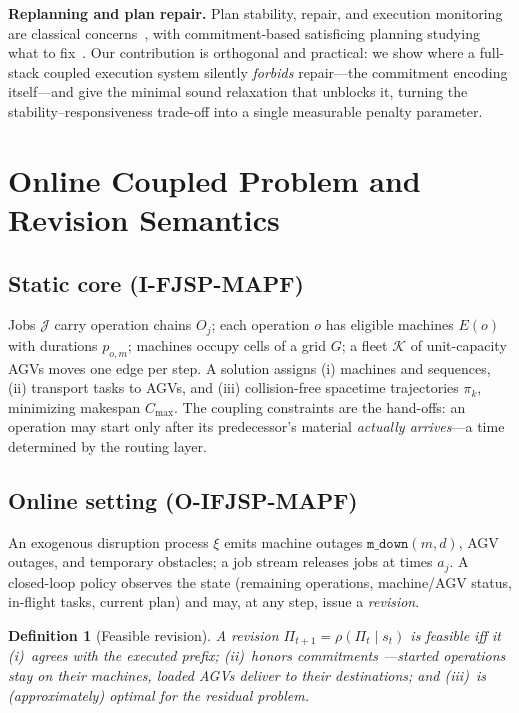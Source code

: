 \documentclass[twocolumn]{article}
\newtheorem{definition}{Definition}
\newcommand{\cmax}{C_{\max}}
\begin{document}
\textbf{Replanning and plan repair.} Plan stability, repair, and
execution monitoring are classical concerns~\cite{fox2006plan}, with
commitment-based satisficing planning studying what to
fix~\cite{domshlak2013satisficing}. Our contribution is orthogonal and
practical: we show where a full-stack coupled execution system silently
\emph{forbids} repair---the commitment encoding itself---and give the
minimal sound relaxation that unblocks it, turning the
stability--responsiveness trade-off into a single measurable penalty
parameter.

\section{Online Coupled Problem and Revision Semantics}
\label{sec:formulation}
\subsection{Static core (I-FJSP-MAPF)}
Jobs $\mathcal{J}$ carry operation chains $O_j$; each operation $o$ has
eligible machines $E(o)$ with durations $p_{o,m}$; machines occupy cells
of a grid $G$; a fleet $\mathcal{K}$ of unit-capacity AGVs moves one edge
per step. A solution assigns (i) machines and sequences, (ii) transport
tasks to AGVs, and (iii) collision-free spacetime trajectories
$\pi_k$, minimizing makespan $\cmax$. The coupling constraints are the
hand-offs: an operation may start only after its predecessor's material
\emph{actually arrives}---a time determined by the routing layer.

\subsection{Online setting (O-IFJSP-MAPF)}
An exogenous disruption process $\xi$ emits machine outages
$\texttt{m\_down}(m,d)$, AGV outages, and temporary obstacles; a job
stream releases jobs at times $a_j$. A closed-loop policy observes the
state (remaining operations, machine/AGV status, in-flight tasks, current
plan) and may, at any step, issue a \emph{revision}.

\begin{definition}[Feasible revision]
A revision $\Pi_{t+1}=\rho(\Pi_t\mid s_t)$ is feasible iff it
(i)~agrees with the executed prefix; (ii)~honors \emph{commitments}
---started operations stay on their machines, loaded AGVs deliver to
their destinations; and (iii)~is (approximately) optimal for the residual
problem.
\end{definition}
\end{document}
